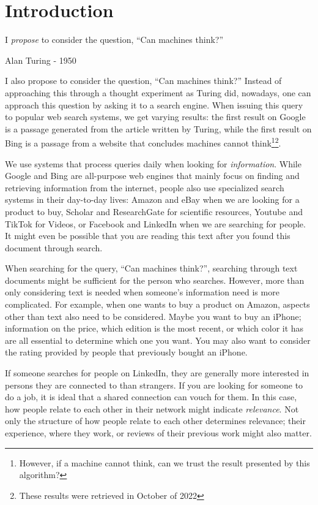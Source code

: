 \chapter{Introduction}
\label{chp:introduction}
\epigraph{I \textit{propose} to consider the question, ``Can machines think?''}{Alan Turing - 1950}

I also propose to consider the question, ``Can machines think?'' Instead of approaching this through a thought experiment as Turing did, nowadays, one can approach this question by asking it to a search engine. When issuing this query to popular web search systems, we get varying results: the first result on Google is a passage generated from the article written by Turing, while the first result on Bing is a passage from a website that concludes machines cannot think\footnote{However, if a machine cannot think, can we trust the result presented by this algorithm?}\footnote{These results were retrieved in October of 2022}.

We use systems that process queries daily when looking for \textit{information}. While Google and Bing are all-purpose web engines that mainly focus on finding and retrieving information from the internet, people also use specialized search systems in their day-to-day lives: Amazon and eBay when we are looking for a product to buy, Scholar and ResearchGate for scientific resources, Youtube and TikTok for Videos, or Facebook and LinkedIn when we are searching for people. It might even be possible that you are reading this text after you found this document through search. 

When searching for the query, ``Can machines think?'', searching through text documents might be sufficient for the person who searches. However, more than only considering text is needed when someone's information need is more complicated. For example, when one wants to buy a product on Amazon, aspects other than text also need to be considered. Maybe you want to buy an iPhone; information on the price, which edition is the most recent, or which color it has are all essential to determine which one you want. You may also want to consider the rating provided by people that previously bought an iPhone.

If someone searches for people on LinkedIn, they are generally more interested in persons they are connected to than strangers. If you are looking for someone to do a job, it is ideal that a shared connection can vouch for them. In this case, how people relate to each other in their network might indicate \textit{relevance}. Not only the structure of how people relate to each other determines relevance; their experience, where they work, or reviews of their previous work might also matter.

